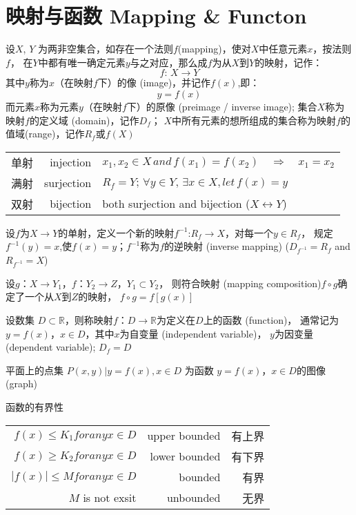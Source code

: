 \documentclass[UTF8]{ctexart}
\begin{document}
\section*{映射与函数 Mapping \& Functon}

\bigskip

设$X$, $Y$ 为两非空集合，如存在一个法则$f$(mapping)，使对$X$中任意元素$x$，按法则$f$，
在$Y$中都有唯一确定元素$y$与之对应，那么成$f$为从$X$到$Y$的映射，记作：
\[
  f:\,X\to Y
\]
其中$y$称为$x$（在映射$f$下）的像 (image)，并记作$f(x)$,即：
\[
  y=f(x)
\]
而元素$x$称为元素$y$（在映射$f$下）的原像 (preimage / inverse image);
集合$X$称为映射$f$的定义域 (domain)，记作$D_f$；
$X$中所有元素的想所组成的集合称为映射$f$的值域(range)，记作$R_f$或$f(X)$

\bigskip
\bigskip

\begin{center}
  \begin{tabular}{crl}
  单射 & injection & $x_1,x_2\in X\,and\,f(x_1)=f(x_2)\quad\Rightarrow\quad x_1=x_2$\\
  满射 & surjection & $R_f=Y; \,\forall y\in Y,\,\exists x\in X, let\, f(x)=y$\\
  双射 & bijection & both surjection and bijection ($X\leftrightarrow Y$)
  \end{tabular}
\end{center}

\bigskip

设$f$为$X\to Y$的单射，定义一个新的映射$f^{-1}$:$R_f\to X$，对每一个$y\in R_f$，
规定$f^{-1}(y)=x$,使$f(x)=y$；$f^{-1}$称为$f$的逆映射 (inverse mapping)
 ($D_{f^{-1}}=R_f$ and $R_{f^{-1}}=X$)

\bigskip

设$g$：$X\to Y_1$，$f$：$Y_2\to Z$，$Y_1\subset Y_2$，
则符合映射 (mapping composition)$f\circ g$确定了一个从$X$到$Z$的映射，
$f\circ g=f[g(x)]$

\bigskip

设数集 $D\subset \mathbb{R}$，则称映射$f$：$D\to\mathbb{R}$为定义在$D$上的函数 (function)，
通常记为$y=f(x)$，$x\in D$，其中$x$为自变量 (independent variable)，
$y$为因变量 (dependent variable); $D_f=D$

\bigskip

平面上的点集 {$P(x,y)| y=f(x),x\in D$} 为函数 $y=f(x)$，$x\in D$的图像 (graph)

\bigskip

函数的有界性

\begin{center}
  \begin{tabular}{rrr}
    $f(x)\le K_1 for any x \in D$ & upper bounded & 有上界\\
    $f(x)\ge K_2 for any x \in D$ & lower bounded & 有下界\\
    $|f(x)|\le M for any x \in D$ & bounded & 有界\\
    $M$ is not exsit & unbounded & 无界
  \end{tabular}
\end{center}
\end{document}

